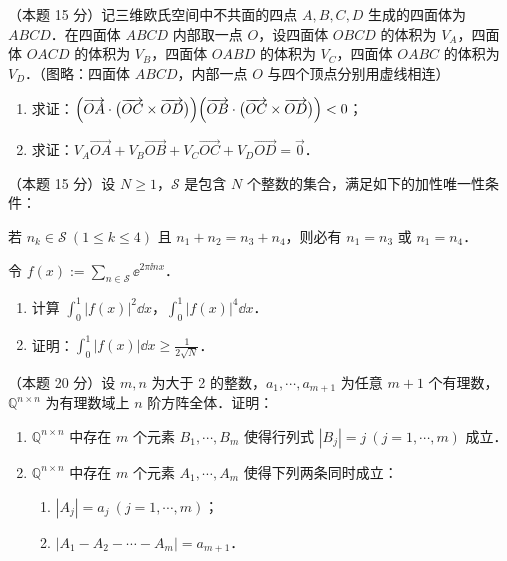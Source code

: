 
\begin{problems}

\item[一、]（本题 15 分）记三维欧氏空间中不共面的四点 $A,B,C,D$ 生成的四面体为 $ABCD$．在四面体 $ABCD$ 内部取一点 $O$，设四面体 $OBCD$ 的体积为 $V_A$，四面体 $OACD$ 的体积为 $V_B$，四面体 $OABD$ 的体积为 $V_C$，四面体 $OABC$ 的体积为 $V_D$．（图略：四面体 $ABCD$，内部一点 $O$ 与四个顶点分别用虚线相连）
\begin{enumerate}[label=(\arabic*)]
  \item 求证：$\Bigl(\overrightarrow{OA}\cdot\bigl(\overrightarrow{OC}\times\overrightarrow{OD}\bigr)\Bigr)\Bigl(\overrightarrow{OB}\cdot\bigl(\overrightarrow{OC}\times\overrightarrow{OD}\bigr)\Bigr)<0$；
  \item 求证：$V_A\overrightarrow{OA}+V_B\overrightarrow{OB}+V_C\overrightarrow{OC}+V_D\overrightarrow{OD}=\vec{0}$．
\end{enumerate}

\item[二、]（本题 15 分）设 $N\geqslant 1$，$\mathcal{S}$ 是包含 $N$ 个整数的集合，满足如下的加性唯一性条件：

若 $n_k\in\mathcal{S}\ (1\leqslant k\leqslant 4)$ 且 $n_1+n_2=n_3+n_4$，则必有 $n_1=n_3$ 或 $n_1=n_4$．

令 $f(x):=\sum\limits_{n\in\mathcal{S}}\ee^{2\pi\ii nx}$．
\begin{enumerate}[label=(\arabic*)]
  \item 计算 $\displaystyle\int_0^1|f(x)|^2\dd x$，$\displaystyle\int_0^1|f(x)|^4\dd x$．
  \item 证明：$\displaystyle\int_0^1|f(x)|\dd x\geqslant\frac{1}{2\sqrt{N}}$．
\end{enumerate}

\item[三、]（本题 20 分）设 $m,n$ 为大于 2 的整数，$a_1,\cdots,a_{m+1}$ 为任意 $m+1$ 个有理数，$\mathbb{Q}^{n\times n}$ 为有理数域上 $n$ 阶方阵全体．证明：
\begin{enumerate}[label=(\arabic*)]
  \item $\mathbb{Q}^{n\times n}$ 中存在 $m$ 个元素 $B_1,\cdots,B_m$ 使得行列式 $|B_j|=j\ (j=1,\cdots,m)$ 成立．
  \item $\mathbb{Q}^{n\times n}$ 中存在 $m$ 个元素 $A_1,\cdots,A_m$ 使得下列两条同时成立：
  \begin{enumerate}[label=(\roman*)]
    \item $|A_j|=a_j\ (j=1,\cdots,m)$；
    \item $|A_1-A_2-\cdots-A_m|=a_{m+1}$．
  \end{enumerate}
\end{enumerate}


\end{problems}
